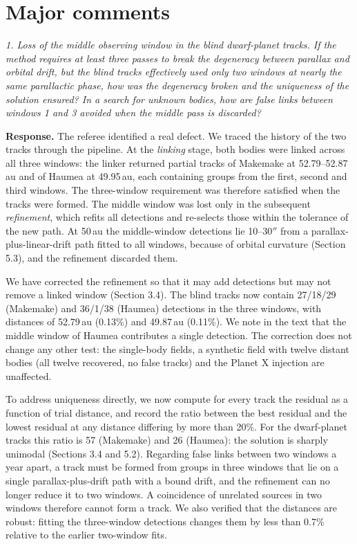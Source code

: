 \documentclass[11pt]{article}
\newenvironment{referee}{\par\color{black!60}\itshape}{\par}
\newcommand{\resp}{\par\noindent\textbf{Response.} }
\begin{document}
\section*{Major comments}

\begin{referee}
1. Loss of the middle observing window in the blind dwarf-planet tracks. If the method requires at least three passes to break the degeneracy between parallax and orbital drift, but the blind tracks effectively used only two windows at nearly the same parallactic phase, how was the degeneracy broken and the uniqueness of the solution ensured? In a search for unknown bodies, how are false links between windows 1 and 3 avoided when the middle pass is discarded?
\end{referee}
\resp The referee identified a real defect. We traced the history of the two tracks through the pipeline. At the \emph{linking} stage, both bodies were linked across all three windows: the linker returned partial tracks of Makemake at 52.79--52.87\,au and of Haumea at 49.95\,au, each containing groups from the first, second and third windows. The three-window requirement was therefore satisfied when the tracks were formed. The middle window was lost only in the subsequent \emph{refinement}, which refits all detections and re-selects those within the tolerance of the new path. At 50\,au the middle-window detections lie 10--30$''$ from a parallax-plus-linear-drift path fitted to all windows, because of orbital curvature (Section 5.3), and the refinement discarded them.

We have corrected the refinement so that it may add detections but may not remove a linked window (Section 3.4). The blind tracks now contain 27/18/29 (Makemake) and 36/1/38 (Haumea) detections in the three windows, with distances of 52.79\,au (0.13\%) and 49.87\,au (0.11\%). We note in the text that the middle window of Haumea contributes a single detection. The correction does not change any other test: the single-body fields, a synthetic field with twelve distant bodies (all twelve recovered, no false tracks) and the Planet X injection are unaffected.

To address uniqueness directly, we now compute for every track the residual as a function of trial distance, and record the ratio between the best residual and the lowest residual at any distance differing by more than 20\%. For the dwarf-planet tracks this ratio is 57 (Makemake) and 26 (Haumea): the solution is sharply unimodal (Sections 3.4 and 5.2). Regarding false links between two windows a year apart, a track must be formed from groups in three windows that lie on a single parallax-plus-drift path with a bound drift, and the refinement can no longer reduce it to two windows. A coincidence of unrelated sources in two windows therefore cannot form a track. We also verified that the distances are robust: fitting the three-window detections changes them by less than 0.7\% relative to the earlier two-window fits.
\end{document}
